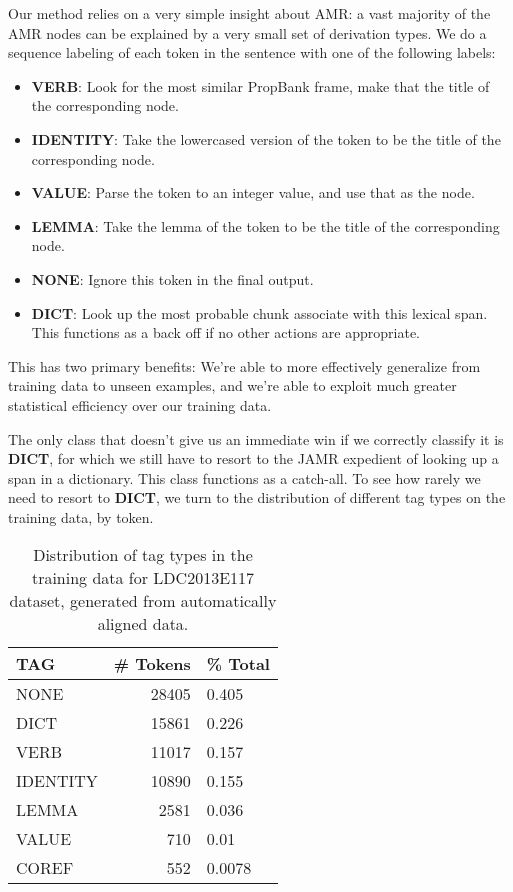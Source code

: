\documentclass[11pt]{article}
\begin{document}

Our method relies on a very simple insight about AMR: a vast majority of the AMR nodes can be explained by a very small set of derivation types. We do a sequence labeling of each token in the sentence with one of the following labels:

\begin{itemize}
\item \textbf{VERB}: Look for the most similar PropBank frame, make that the title of the corresponding node.
\item \textbf{IDENTITY}: Take the lowercased version of the token to be the title of the corresponding node.
\item \textbf{VALUE}: Parse the token to an integer value, and use that as the node.
\item \textbf{LEMMA}: Take the lemma of the token to be the title of the corresponding node.
\item \textbf{NONE}: Ignore this token in the final output.
\item \textbf{DICT}: Look up the most probable chunk associate with this lexical span. This functions as a back off if no other actions are appropriate.
\end{itemize}

This has two primary benefits: We're able to more effectively generalize from training data to unseen examples, and we're able to exploit much greater statistical efficiency over our training data. 

The only class that doesn't give us an immediate win if we correctly classify it is \textbf{DICT}, for which we still have to resort to the JAMR expedient of looking up a span in a dictionary. This class functions as a catch-all. To see how rarely we need to resort to \textbf{DICT}, we turn to the distribution of different tag types on the training data, by token.

\begin{table}[h]
\begin{center}
\begin{tabular}{|l|rl|}
\hline \bf TAG & \bf \# Tokens & \bf \% Total \\ \hline
NONE & 28405 & 0.405\\
DICT & 15861 & 0.226 \\
VERB & 11017 & 0.157 \\
IDENTITY & 10890 & 0.155 \\
LEMMA & 2581 & 0.036 \\
VALUE & 710  & 0.01\\
COREF & 552 & 0.0078 \\
\hline
\end{tabular}
\end{center}
\caption{\label{font-table} Distribution of tag types in the training data for LDC2013E117 dataset, generated from automatically aligned data. }
\end{table}
\end{document}
